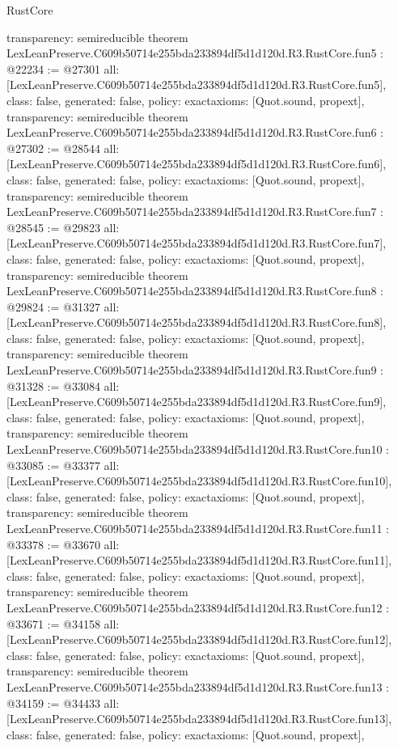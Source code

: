 \begin{lexlean}{RustCore}
\begin{coremodule}
{  transparency: semireducible
}
theorem LexLeanPreserve.C609b50714e255bda233894df5d1d120d.R3.RustCore.fun5 : @22234 := @27301 {
  all: [LexLeanPreserve.C609b50714e255bda233894df5d1d120d.R3.RustCore.fun5],
  class: false,
  generated: false,
  policy: exact{axioms: [Quot.sound, propext]},
  transparency: semireducible
}
theorem LexLeanPreserve.C609b50714e255bda233894df5d1d120d.R3.RustCore.fun6 : @27302 := @28544 {
  all: [LexLeanPreserve.C609b50714e255bda233894df5d1d120d.R3.RustCore.fun6],
  class: false,
  generated: false,
  policy: exact{axioms: [Quot.sound, propext]},
  transparency: semireducible
}
theorem LexLeanPreserve.C609b50714e255bda233894df5d1d120d.R3.RustCore.fun7 : @28545 := @29823 {
  all: [LexLeanPreserve.C609b50714e255bda233894df5d1d120d.R3.RustCore.fun7],
  class: false,
  generated: false,
  policy: exact{axioms: [Quot.sound, propext]},
  transparency: semireducible
}
theorem LexLeanPreserve.C609b50714e255bda233894df5d1d120d.R3.RustCore.fun8 : @29824 := @31327 {
  all: [LexLeanPreserve.C609b50714e255bda233894df5d1d120d.R3.RustCore.fun8],
  class: false,
  generated: false,
  policy: exact{axioms: [Quot.sound, propext]},
  transparency: semireducible
}
theorem LexLeanPreserve.C609b50714e255bda233894df5d1d120d.R3.RustCore.fun9 : @31328 := @33084 {
  all: [LexLeanPreserve.C609b50714e255bda233894df5d1d120d.R3.RustCore.fun9],
  class: false,
  generated: false,
  policy: exact{axioms: [Quot.sound, propext]},
  transparency: semireducible
}
theorem LexLeanPreserve.C609b50714e255bda233894df5d1d120d.R3.RustCore.fun10 : @33085 := @33377 {
  all: [LexLeanPreserve.C609b50714e255bda233894df5d1d120d.R3.RustCore.fun10],
  class: false,
  generated: false,
  policy: exact{axioms: [Quot.sound, propext]},
  transparency: semireducible
}
theorem LexLeanPreserve.C609b50714e255bda233894df5d1d120d.R3.RustCore.fun11 : @33378 := @33670 {
  all: [LexLeanPreserve.C609b50714e255bda233894df5d1d120d.R3.RustCore.fun11],
  class: false,
  generated: false,
  policy: exact{axioms: [Quot.sound, propext]},
  transparency: semireducible
}
theorem LexLeanPreserve.C609b50714e255bda233894df5d1d120d.R3.RustCore.fun12 : @33671 := @34158 {
  all: [LexLeanPreserve.C609b50714e255bda233894df5d1d120d.R3.RustCore.fun12],
  class: false,
  generated: false,
  policy: exact{axioms: [Quot.sound, propext]},
  transparency: semireducible
}
theorem LexLeanPreserve.C609b50714e255bda233894df5d1d120d.R3.RustCore.fun13 : @34159 := @34433 {
  all: [LexLeanPreserve.C609b50714e255bda233894df5d1d120d.R3.RustCore.fun13],
  class: false,
  generated: false,
  policy: exact{axioms: [Quot.sound, propext]},
}
\end{coremodule}
\end{lexlean}
